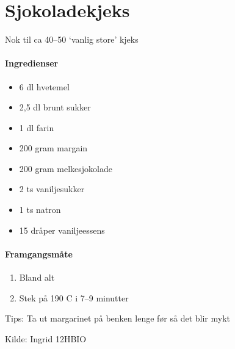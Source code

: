 \section{﻿Sjokoladekjeks}
Nok til ca 40--50 `vanlig store' kjeks

\paragraph{Ingredienser}
\begin{itemize}[noitemsep]
	\item 6 dl hvetemel
	\item 2,5 dl brunt sukker
	\item 1 dl farin
	\item 200 gram margain
	\item 200 gram melkesjokolade
	\item 2 ts vaniljesukker
	\item 1 ts natron
	\item 15 dråper vaniljeessens
\end{itemize}

\paragraph{Framgangsmåte}
\begin{enumerate}[noitemsep]
	\item Bland alt
	\item Stek på 190 \degree C i 7--9 minutter
\end{enumerate}

Tips: Ta ut margarinet på benken lenge før så det blir mykt

Kilde: Ingrid 12HBIO
